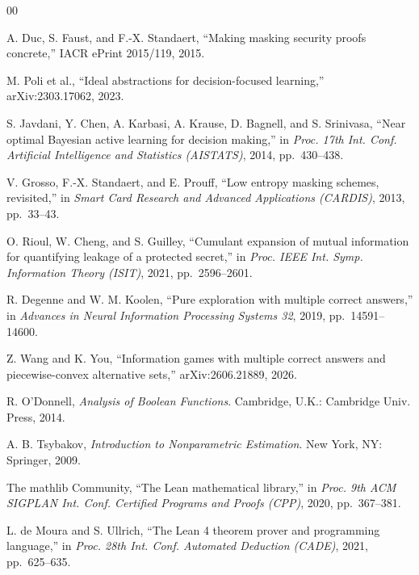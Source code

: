 \begin{thebibliography}{00}

 A. Duc, S. Faust, and F.-X. Standaert, ``Making masking security
proofs concrete,'' IACR ePrint 2015/119, 2015.

 M. Poli et al., ``Ideal abstractions for decision-focused learning,''
arXiv:2303.17062, 2023.


 S. Javdani, Y. Chen, A. Karbasi, A. Krause, D. Bagnell, and
S. Srinivasa, ``Near optimal Bayesian active learning for decision making,'' in
\emph{Proc. 17th Int. Conf. Artificial Intelligence and Statistics (AISTATS)}, 2014,
pp.~430--438.

 V. Grosso, F.-X. Standaert, and E. Prouff, ``Low entropy masking
schemes, revisited,'' in \emph{Smart Card Research and Advanced Applications (CARDIS)},
2013, pp.~33--43.

 O. Rioul, W. Cheng, and S. Guilley, ``Cumulant expansion of mutual
information for quantifying leakage of a protected secret,'' in \emph{Proc. IEEE Int. Symp.
Information Theory (ISIT)}, 2021, pp.~2596--2601.

 R. Degenne and W. M. Koolen, ``Pure exploration with multiple correct
answers,'' in \emph{Advances in Neural Information Processing Systems 32}, 2019,
pp.~14591--14600.

 Z. Wang and K. You, ``Information games with multiple correct answers
and piecewise-convex alternative sets,'' arXiv:2606.21889, 2026.

 R. O'Donnell, \emph{Analysis of Boolean Functions}. Cambridge,
U.K.: Cambridge Univ. Press, 2014.

 A. B. Tsybakov, \emph{Introduction to Nonparametric Estimation}.
New York, NY: Springer, 2009.

 The mathlib Community, ``The Lean mathematical library,'' in
\emph{Proc. 9th ACM SIGPLAN Int. Conf. Certified Programs and Proofs (CPP)}, 2020,
pp.~367--381.

 L. de Moura and S. Ullrich, ``The Lean 4 theorem prover and
programming language,'' in \emph{Proc. 28th Int. Conf. Automated Deduction (CADE)}, 2021,
pp.~625--635.

\end{thebibliography}


